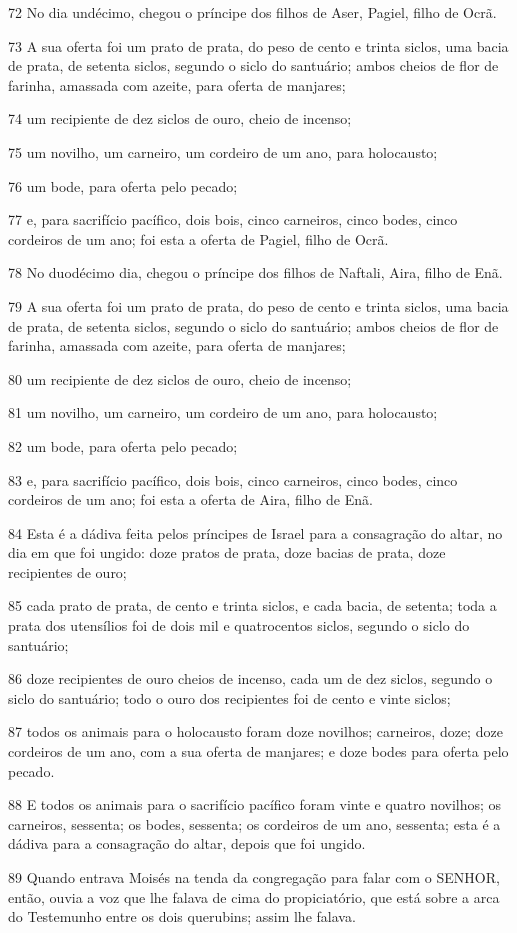 \par 72 No dia undécimo, chegou o príncipe dos filhos de Aser, Pagiel, filho de Ocrã.
\par 73 A sua oferta foi um prato de prata, do peso de cento e trinta siclos, uma bacia de prata, de setenta siclos, segundo o siclo do santuário; ambos cheios de flor de farinha, amassada com azeite, para oferta de manjares;
\par 74 um recipiente de dez siclos de ouro, cheio de incenso;
\par 75 um novilho, um carneiro, um cordeiro de um ano, para holocausto;
\par 76 um bode, para oferta pelo pecado;
\par 77 e, para sacrifício pacífico, dois bois, cinco carneiros, cinco bodes, cinco cordeiros de um ano; foi esta a oferta de Pagiel, filho de Ocrã.
\par 78 No duodécimo dia, chegou o príncipe dos filhos de Naftali, Aira, filho de Enã.
\par 79 A sua oferta foi um prato de prata, do peso de cento e trinta siclos, uma bacia de prata, de setenta siclos, segundo o siclo do santuário; ambos cheios de flor de farinha, amassada com azeite, para oferta de manjares;
\par 80 um recipiente de dez siclos de ouro, cheio de incenso;
\par 81 um novilho, um carneiro, um cordeiro de um ano, para holocausto;
\par 82 um bode, para oferta pelo pecado;
\par 83 e, para sacrifício pacífico, dois bois, cinco carneiros, cinco bodes, cinco cordeiros de um ano; foi esta a oferta de Aira, filho de Enã.
\par 84 Esta é a dádiva feita pelos príncipes de Israel para a consagração do altar, no dia em que foi ungido: doze pratos de prata, doze bacias de prata, doze recipientes de ouro;
\par 85 cada prato de prata, de cento e trinta siclos, e cada bacia, de setenta; toda a prata dos utensílios foi de dois mil e quatrocentos siclos, segundo o siclo do santuário;
\par 86 doze recipientes de ouro cheios de incenso, cada um de dez siclos, segundo o siclo do santuário; todo o ouro dos recipientes foi de cento e vinte siclos;
\par 87 todos os animais para o holocausto foram doze novilhos; carneiros, doze; doze cordeiros de um ano, com a sua oferta de manjares; e doze bodes para oferta pelo pecado.
\par 88 E todos os animais para o sacrifício pacífico foram vinte e quatro novilhos; os carneiros, sessenta; os bodes, sessenta; os cordeiros de um ano, sessenta; esta é a dádiva para a consagração do altar, depois que foi ungido.
\par 89 Quando entrava Moisés na tenda da congregação para falar com o SENHOR, então, ouvia a voz que lhe falava de cima do propiciatório, que está sobre a arca do Testemunho entre os dois querubins; assim lhe falava.

